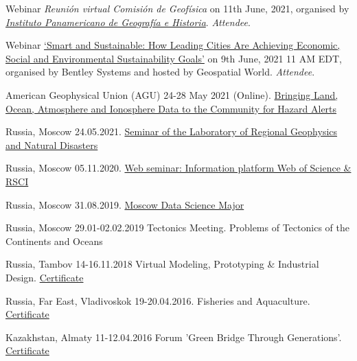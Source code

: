 \documentclass[10pt]{article}
\renewcommand{\section}[2]%
        {\pagebreak[2]\vspace{1.3\baselineskip}%
         \phantomsection\addcontentsline{toc}{section}{#1}%
         \hspace{0in}%
         \marginpar{
         \raggedright \scshape #1}#2}
\begin{document}

\section{Events} 

\begin{etaremune} 

	\item Webinar \emph{Reunión virtual Comisión de Geofísica} on 11th June, 2021, organised by \emph{\href{https://www.ipgh.org/}{Instituto Panamericano de Geografía e Historia}}. \emph{Attendee}.
	\item Webinar \href{https://geospatialworld.net/virtual-events/bentley/smartcities4.0.html}{‘Smart and Sustainable: How Leading Cities Are Achieving Economic, Social and Environmental Sustainability Goals’} on 9th June, 2021 11 AM EDT, organised by Bentley Systems and hosted by Geospatial World. \emph{Attendee}.
	\item	American Geophysical Union (AGU) 24-28 May 2021 (Online). \href{https://agu.confex.com/agu/21workshop2/meetingapp.cgi/Home/0}{Bringing Land, Ocean, Atmosphere and Ionosphere Data to the Community for Hazard Alerts}	
	\item	Russia, Moscow 24.05.2021. \href{https://www.ifz.ru/novosti/24-maya-2021-goda-sostoitsya-seminar-laboratorii-regionalnoj-geofiziki-i-prirodnyix-katastrof}{Seminar of the Laboratory of Regional Geophysics and Natural Disasters}		
	\item	Russia, Moscow 05.11.2020. \href{https://drive.google.com/file/d/14e58LWu4wbZRniu8l9HB7-q6EqJmlDbl/view?usp=sharing}{Web seminar: Information platform Web of Science \& RSCI}		
	\item	Russia, Moscow 31.08.2019. \href{https://corp.mail.ru/ru/press/events/mdsm_aug19/}{Moscow Data Science Major} 		
	\item	Russia, Moscow 29.01-02.02.2019  Tectonics Meeting. Problems of Tectonics of the Continents and Oceans 	
    	\item	Russia, Tambov 14-16.11.2018 Virtual Modeling, Prototyping \& Industrial Design. \href{https://drive.google.com/file/d/1MYXw3WsHmUjq03rlvg3Ti8Gwg1BUu4dr/view?usp=sharing}{Certificate}		
	\item	Russia, Far East, Vladivoskok 19-20.04.2016. Fisheries and Aquaculture. \href{https://drive.google.com/open?id=1-r6f_m2p2iHR98SMeXwXt_M_0WIOYgqU}{Certificate}
	\item Kazakhstan, Almaty 11-12.04.2016  Forum 'Green Bridge Through Generations'. \href{https://drive.google.com/open?id=1s08GHSZrQcXYmJvbcFvF2v68FWi92Lb0}{Certificate}	

\end{etaremune}
\end{document}
